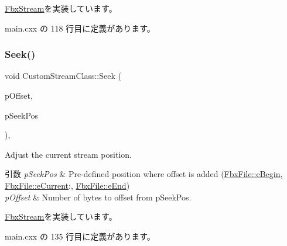 \hyperlink{class_fbx_stream_a2621d456bfda1f0e4e3492bcc81ec2e6}{Fbx\+Stream}を実装しています。



 main.\+cxx の 118 行目に定義があります。

\mbox{\label{class_custom_stream_class_aa4b267f0e7bb68f020bf53ac3a7a316e}} 
\subsubsection{\texorpdfstring{Seek()}{Seek()}}
{\footnotesize\ttfamily void Custom\+Stream\+Class\+::\+Seek (\begin{DoxyParamCaption}\item[{const \hyperlink{fbxtypes_8h_ac7e1334c7c6aacc9c8a9dccddebb4368}{Fbx\+Int64} \&}]{p\+Offset,  }\item[{const \hyperlink{class_fbx_file_aba91fe59f9c0a4c84a92f13c0c27deec}{Fbx\+File\+::\+E\+Seek\+Pos} \&}]{p\+Seek\+Pos }\end{DoxyParamCaption})\hspace{0.3cm}{\ttfamily [inline]}, {\ttfamily [virtual]}}

Adjust the current stream position. 
\begin{DoxyParams}{引数}
{\em p\+Seek\+Pos} & Pre-\/defined position where offset is added (\hyperlink{class_fbx_file_aba91fe59f9c0a4c84a92f13c0c27deeca7a474ae0aa6f46b8becdfe54208f928e}{Fbx\+File\+::e\+Begin}, \hyperlink{class_fbx_file_aba91fe59f9c0a4c84a92f13c0c27deecaf2653dc9849e794feee37a015d80b098}{Fbx\+File\+::e\+Current}\+:, \hyperlink{class_fbx_file_aba91fe59f9c0a4c84a92f13c0c27deeca1ab3eb84e8694fd4e63d0c864b12508d}{Fbx\+File\+::e\+End}) \\
\hline
{\em p\+Offset} & Number of bytes to offset from p\+Seek\+Pos. \\
\hline
\end{DoxyParams}


\hyperlink{class_fbx_stream_a00041c3874c430a77fb7e69a9adc894f}{Fbx\+Stream}を実装しています。



 main.\+cxx の 135 行目に定義があります。

\mbox{\label{class_custom_stream_class_a93d790e1ed854c5383b7854719e2f2c8}} 

